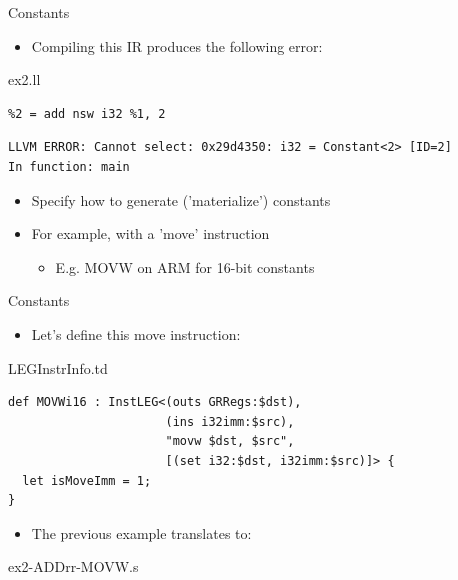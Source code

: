 \begin{frame}[fragile]{Constants}

\begin{itemize}
    \item Compiling this IR produces the following error:
\end{itemize}

\begin{block}{ex2.ll}
\begin{lstlisting}
%2 = add nsw i32 %1, 2
\end{lstlisting}
\end{block}

\begin{block}{}
\begin{lstlisting}
LLVM ERROR: Cannot select: 0x29d4350: i32 = Constant<2> [ID=2]
In function: main
\end{lstlisting}
\end{block}

\begin{itemize}
    \item Specify how to generate ('materialize') constants
    \item For example, with a 'move' instruction
    \begin{itemize}
        \item E.g. MOVW on ARM for 16-bit constants
    \end{itemize}
\end{itemize}

\end{frame}


\begin{frame}[fragile]{Constants}

\begin{itemize}
    \item Let's define this move instruction:
\end{itemize}

\begin{block}{LEGInstrInfo.td}
\begin{lstlisting}
def MOVWi16 : InstLEG<(outs GRRegs:$dst),
                      (ins i32imm:$src),
                      "movw $dst, $src",
                      [(set i32:$dst, i32imm:$src)]> {
  let isMoveImm = 1;
}
\end{lstlisting}
\end{block}

\begin{itemize}
    \item The previous example translates to:
\end{itemize}

\begin{block}{ex2-ADDrr-MOVW.s}

\end{block}

\end{frame}

